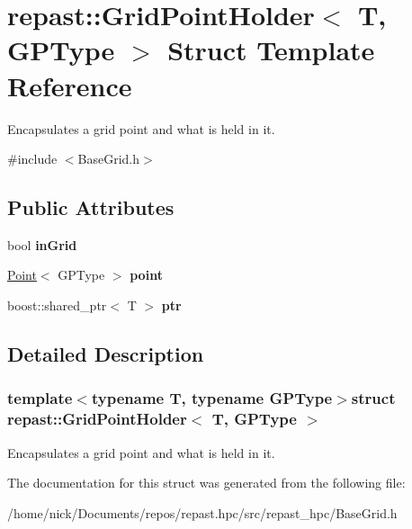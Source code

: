 \hypertarget{structrepast_1_1_grid_point_holder}{\section{repast\-:\-:Grid\-Point\-Holder$<$ T, G\-P\-Type $>$ Struct Template Reference}
\label{structrepast_1_1_grid_point_holder}
}


Encapsulates a grid point and what is held in it.  




{\ttfamily \#include $<$Base\-Grid.\-h$>$}

\subsection*{Public Attributes}
\begin{DoxyCompactItemize}
\item 
\hypertarget{structrepast_1_1_grid_point_holder_a11a11a29f6d73f6766a18ce83b9404a3}{bool {\bfseries in\-Grid}}\label{structrepast_1_1_grid_point_holder_a11a11a29f6d73f6766a18ce83b9404a3}

\item 
\hypertarget{structrepast_1_1_grid_point_holder_a9a290fdba30d1ea6de4f4314f52c2012}{\hyperlink{classrepast_1_1_point}{Point}$<$ G\-P\-Type $>$ {\bfseries point}}\label{structrepast_1_1_grid_point_holder_a9a290fdba30d1ea6de4f4314f52c2012}

\item 
\hypertarget{structrepast_1_1_grid_point_holder_a2f250cd6c9542010610957b75b8ff088}{boost\-::shared\-\_\-ptr$<$ T $>$ {\bfseries ptr}}\label{structrepast_1_1_grid_point_holder_a2f250cd6c9542010610957b75b8ff088}

\end{DoxyCompactItemize}


\subsection{Detailed Description}
\subsubsection*{template$<$typename T, typename G\-P\-Type$>$struct repast\-::\-Grid\-Point\-Holder$<$ T, G\-P\-Type $>$}

Encapsulates a grid point and what is held in it. 

The documentation for this struct was generated from the following file\-:\begin{DoxyCompactItemize}
\item 
/home/nick/\-Documents/repos/repast.\-hpc/src/repast\-\_\-hpc/Base\-Grid.\-h\end{DoxyCompactItemize}
